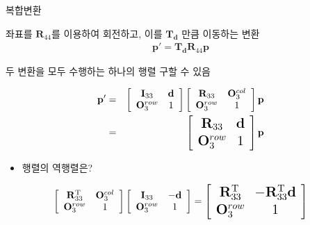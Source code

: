 \begin{frame}{복합변환}


좌표를 $\mathbf R_{44}$를 이용하여 회전하고, 이를 $\mathbf T_{\mathbf d}$ 만큼 이동하는 변환
\begin{eqnarray}
\mathbf p' = \mathbf T_{\mathbf d} \mathbf R_{44}  \mathbf p \nonumber
\end{eqnarray}

두 변환을 모두 수행하는 하나의 행렬 구할 수 있음 

\begin{eqnarray}
\mathbf p' & = &
\left [
\begin{array}{cc}
\mathbf I_{33} & \mathbf d \\
\mathbf O_3^{row} & 1
\end{array}
\right ]
\left [
\begin{array}{cc}
\mathbf R_{33} & \mathbf O_3^{col} \\
\mathbf O_3^{row} & 1
\end{array}
\right ]
\mathbf p \nonumber \\
& = &
\Large{
\left [
\begin{array}{cc}
\mathbf R_{33} & \mathbf d \\
\mathbf O_3^{row} & 1
\end{array}
\right ]
\mathbf p} \nonumber
\end{eqnarray}

\begin{itemize}
\item 행렬의 역행렬은?
\end{itemize}

\begin{eqnarray}
\left [
\begin{array}{cc}
\mathbf R_{33}^{\rm T} & \mathbf O_3^{col} \\
\mathbf O_3^{row} & 1
\end{array}
\right ]
\left [
\begin{array}{cc}
\mathbf I_{33} & - \mathbf d \\
\mathbf O_3^{row} & 1
\end{array}
\right ]
= 
\Large{
\left [
\begin{array}{cc}
\mathbf R_{33}^{\rm T} & - \mathbf R_{33}^{\rm T} \mathbf d \\
\mathbf O_3^{row} & 1
\end{array}
\right ]
} \nonumber
\end{eqnarray}

\end{frame}


